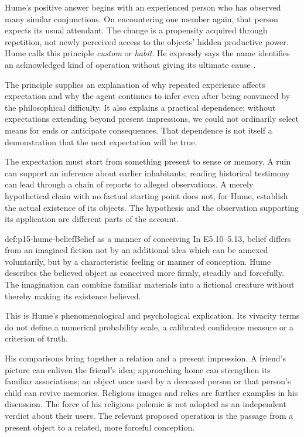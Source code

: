 Hume's positive answer begins with an experienced person who has observed
many similar conjunctions. On encountering one member again, that person
expects its usual attendant. The change is a propensity acquired through
repetition, not newly perceived access to the objects' hidden productive
power. Hume calls this principle \emph{custom} or \emph{habit}. He
expressly says the name identifies an acknowledged kind of operation
without giving its ultimate cause
\parencite[E~5.2--5.6]{Hume1777EnquiryHTO}.

The principle supplies an explanation of why repeated experience affects
expectation and why the agent continues to infer even after being
convinced by the philosophical difficulty. It also explains a practical
dependence: without expectations extending beyond present impressions,
we could not ordinarily select means for ends or anticipate consequences.
That dependence is not itself a demonstration that the next expectation
will be true.

The expectation must start from something present to sense or memory.
A ruin can support an inference about earlier inhabitants; reading
historical testimony can lead through a chain of reports to alleged
observations. A merely hypothetical chain with no factual starting point
does not, for Hume, establish the actual existence of its objects.
The hypothesis and the observation supporting its application are
different parts of the account.

\begin{hbdefinition}{def:p15-hume-belief}{Belief as a manner of conceiving}
In E5.10--5.13, belief differs from an imagined fiction not by an
additional idea which can be annexed voluntarily, but by a characteristic
feeling or manner of conception. Hume describes the believed object as
conceived more firmly, steadily and forcefully. The imagination can
combine familiar materials into a fictional creature without thereby
making its existence believed.

This is Hume's phenomenological and psychological explication. Its
vivacity terms do not define a numerical probability scale, a calibrated
confidence measure or a criterion of truth.
\end{hbdefinition}

His comparisons bring together a relation and a present impression.
A friend's picture can enliven the friend's idea; approaching home can
strengthen its familiar associations; an object once used by a deceased
person or that person's child can revive memories. Religious images
and relics are further examples in his discussion. The force of his
religious polemic is not adopted as an independent verdict about their
users. The relevant proposed operation is the passage from a present
object to a related, more forceful conception.

